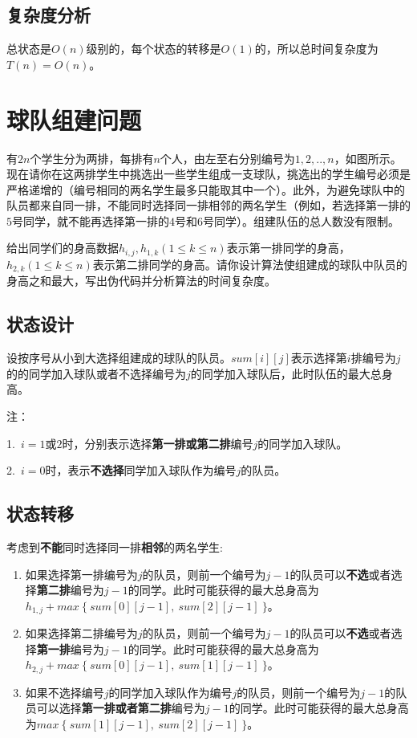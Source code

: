 \documentclass{article}
\begin{document}
\subsection{复杂度分析}
总状态是$O(n)$级别的，每个状态的转移是$O(1)$的，所以总时间复杂度为$T(n)=O(n)$。

\section{球队组建问题}

有$2n$个学生分为两排，每排有$n$个人，由左至右分别编号为$1, 2,.. , n$，如图所示。现在请你在这两排学生中挑选出一些学生组成一支球队，挑选出的学生编号必须是严格递增的（编号相同的两名学生最多只能取其中一个）。此外，为避免球队中的队员都来自同一排，不能同时选择同一排相邻的两名学生（例如，若选择第一排的$5$号同学，就不能再选择第一排的$4$号和$6$号同学）。组建队伍的总人数没有限制。

给出同学们的身高数据$h_{i,j},h_{1,k}(1\leq k\leq n)$表示第一排同学的身高，$h_{2,k}(1\leq k\leq n)$表示第二排同学的身高。请你设计算法使组建成的球队中队员的身高之和最大，写出伪代码并分析算法的时间复杂度。

\subsection{状态设计}
设按序号从小到大选择组建成的球队的队员。$sum[i][j]$表示选择第$i$排编号为$j$的的同学加入球队或者不选择编号为$j$的同学加入球队后，此时队伍的最大总身高。

注：


\noindent
{}
\setlength{\hangindent}{48pt}
\hspace{45pt}1.\ $i=1$或$2$时，分别表示选择\textbf{第一排或第二排}编号$j$的同学加入球队。

\noindent
{}
\setlength{\hangindent}{48pt}
\hspace{45pt}2.\ $i=0$时，表示\textbf{不选择}同学加入球队作为编号$j$的队员。


\subsection{状态转移}
考虑到\textbf{不能}同时选择同一排\textbf{相邻}的两名学生:
\begin{enumerate}
	\item 如果选择第一排编号为$j$的队员，则前一个编号为$j-1$的队员可以\textbf{不选}或者选择\textbf{第二排}编号为$j-1$的同学。此时可能获得的最大总身高为$h_{1,j}+max\ \{\ sum[0][j-1],\ sum[2][j-1]\ \}$。
	\item 如果选择第二排编号为$j$的队员，则前一个编号为$j-1$的队员可以\textbf{不选}或者选择\textbf{第一排}编号为$j-1$的同学。此时可能获得的最大总身高为$h_{2,j}+max\ \{\ sum[0][j-1],\ sum[1][j-1]\ \}$。
	\item 如果不选择编号$j$的同学加入球队作为编号$j$的队员，则前一个编号为$j-1$的队员可以选择\textbf{第一排或者第二排}编号为$j-1$的同学。此时可能获得的最大总身高为$max\ \{\ sum[1][j-1],\ sum[2][j-1]\ \}$。
\end{enumerate}
\end{document}
